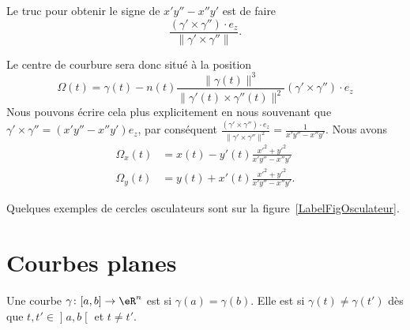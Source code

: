 Le truc pour obtenir le signe de \( x'y''-x''y'\) est de faire
\begin{equation}
	\frac{ (\gamma'\times\gamma'')\cdot e_z}{\| \gamma'\times\gamma'' \|}.
\end{equation}

Le centre de courbure sera donc situé à la position
\begin{equation}
	\Omega(t)=\gamma(t)-n(t)\frac{ \| \gamma(t) \|^3 }{ \| \gamma'(t)\times\gamma''(t) \|^2 } (\gamma'\times\gamma'')\cdot e_z
\end{equation}
Nous pouvons écrire cela plus explicitement en nous souvenant que \( \gamma'\times\gamma''=(x'y''-x''y')e_z\), par conséquent \( \frac{ (\gamma'\times\gamma'')\cdot e_z}{\| \gamma'\times\gamma'' \|^2}=\frac{1}{ x'y''-x''y' }\). Nous avons
\begin{subequations}
	\begin{align}
		\Omega_x(t) & =x(t)-y'(t)\frac{ x'^2+y'^2 }{ x'y''-x''y' }  \\
		\Omega_y(t) & =y(t)+x'(t)\frac{ x'^2+y'^2 }{ x'y''-x''y' }.
	\end{align}
\end{subequations}

Quelques exemples de cercles osculateurs sont sur la figure~\ref{LabelFigOsculateur}.
\newcommand{\CaptionFigOsculateur}{Exemple de cercles osculateurs.}



\section{Courbes planes}

\begin{definition}
	Une courbe \( \gamma\colon \mathopen[ a , b \mathclose]\to \eR^n\) est  si \( \gamma(a)=\gamma(b)\). Elle est  si \( \gamma(t)\neq \gamma(t')\) dès que \( t,t'\in\mathopen] a , b \mathclose[\) et \( t\neq  t'\).
\end{definition}

